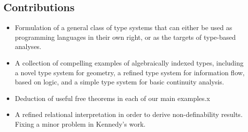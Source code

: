\subsection{Contributions}
\label{sec:contributions}

\begin{itemize}
\item Formulation of a general class of type systems that can either
  be used as programming languages in their own right, or as the
  targets of type-based analyses.
\item A collection of compelling examples of algebraically indexed
  types, including a novel type system for geometry, a refined type
  system for information flow, based on logic, and a simple type
  system for basic continuity analysis.
\item Deduction of useful free theorems in each of our main examples.x
\item A refined relational interpretation in order to derive
  non-definability results. Fixing a minor problem in Kennedy's work.
\end{itemize}

